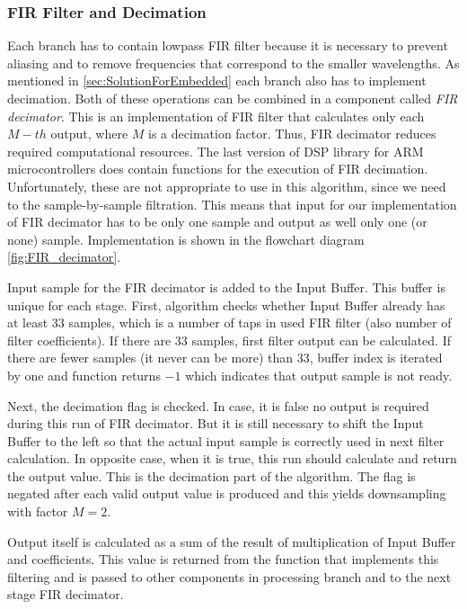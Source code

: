 \documentclass[twoside]{ctuthesis}
\theoremstyle{plain}
\theoremstyle{definition}
\theoremstyle{note}
\begin{document}
\subsubsection{FIR Filter and Decimation}
\label{FIR filter}
Each branch has to contain lowpass FIR filter because it is necessary to prevent aliasing and to remove frequencies that correspond to the smaller wavelengths. As mentioned in \ref{sec:SolutionForEmbedded} each branch also has to implement decimation. Both of these operations can be combined in a component called \textit{FIR decimator}. This is an implementation of FIR filter that calculates only each $M-th$ output, where $M$ is a decimation factor. Thus, FIR decimator reduces required computational resources. 
The last version of DSP library for ARM microcontrollers does contain functions for the execution of FIR decimation. Unfortunately, these are not appropriate to use in this algorithm, since we need to the sample-by-sample filtration. This means that input for our implementation of FIR decimator has to be only one sample and output as well only one (or none) sample. Implementation is shown in the flowchart diagram \ref{fig:FIR_decimator}.

Input sample for the FIR decimator is added to the Input Buffer. This buffer is unique for each stage. First, algorithm checks whether Input Buffer already has at least 33 samples, which is a number of taps in used FIR filter (also number of filter coefficients). If there are 33 samples, first filter output can be calculated. If there are fewer samples (it never can be more) than 33, buffer index is iterated by one and function returns $-1$ which indicates that output sample is not ready.

Next, the decimation flag is checked. In case, it is false no output is required during this run of FIR decimator. But it is still necessary to shift the Input Buffer to the left so that the actual input sample is correctly used in next filter calculation. In opposite case, when it is true, this run should calculate and return the output value. This is the decimation part of the algorithm. The flag is negated after each valid output value is produced and this yields downsampling with factor $M=2$.

Output itself is calculated as a sum of the result of multiplication of Input Buffer and coefficients. This value is returned from the function that implements this filtering and is passed to other components in processing branch and to the next stage FIR decimator.
\end{document}
